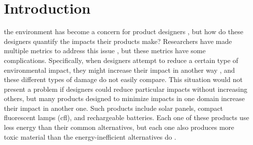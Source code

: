 \documentclass[final,journal,10pt,letterpaper,oneside,twocolumn,compsoc]%
{IEEEtran}
\begin{document}
\maketitle
\IEEEdisplaynontitleabstractindextext




%
\IEEEpeerreviewmaketitle



\section{Introduction}
% 
% 
% 
% 
 the environment has become a concern for product
designers \cite{desktop2} \cite{client}, but how do these designers quantify the
impacts their products make? Researchers have made multiple metrics to address
this issue \cite{14040} \cite{14044} \cite{gabi}, but these metrics have some
complications. Specifically, when designers attempt to reduce a certain type of
environmental impact, they might increase their impact in another way
\cite{solar} \cite{cfl} \cite{battery}, and these different types of damage do
not easily compare. This situation would not present a problem if designers
could reduce particular impacts without increasing others, but many products
designed to minimize impacts in one domain increase their impact in another one.
Such products include solar panels, compact fluorescent lamps (cfl), and
rechargeable batteries. Each one of these products use less energy than their
common alternatives, but each one also produces more toxic material than the
energy-inefficient alternatives do \cite{solar} \cite{cfl} \cite{battery}.
\end{document}
